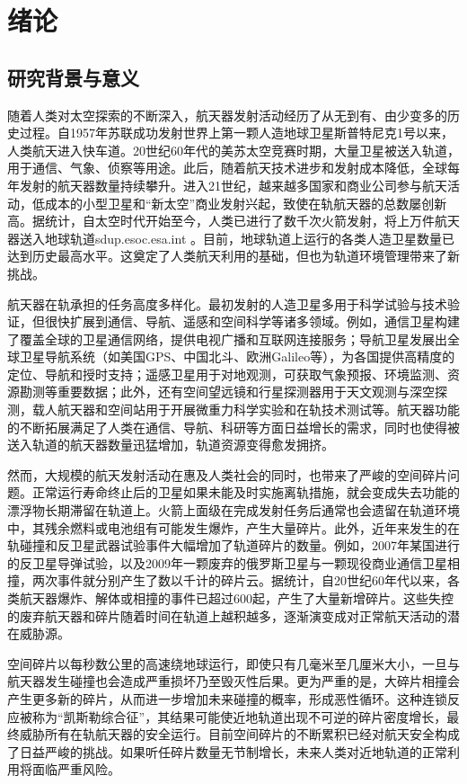 
\chapter{绪论}
\label{chap:intro}

\section{研究背景与意义}
随着人类对太空探索的不断深入，航天器发射活动经历了从无到有、由少变多的历史过程。自1957年苏联成功发射世界上第一颗人造地球卫星斯普特尼克1号以来，人类航天进入快车道。20世纪60年代的美苏太空竞赛时期，大量卫星被送入轨道，用于通信、气象、侦察等用途。此后，随着航天技术进步和发射成本降低，全球每年发射的航天器数量持续攀升。进入21世纪，越来越多国家和商业公司参与航天活动，低成本的小型卫星和“新太空”商业发射兴起，致使在轨航天器的总数屡创新高。据统计，自太空时代开始至今，人类已进行了数千次火箭发射，将上万件航天器送入地球轨道​
sdup.esoc.esa.int
。目前，地球轨道上运行的各类人造卫星数量已达到历史最高水平\cite{prol2022position,zhao2022overview}。这奠定了人类航天利用的基础，但也为轨道环境管理带来了新挑战。

航天器在轨承担的任务高度多样化。最初发射的人造卫星多用于科学试验与技术验证，但很快扩展到通信、导航、遥感和空间科学等诸多领域。例如，通信卫星构建了覆盖全球的卫星通信网络，提供电视广播和互联网连接服务；导航卫星发展出全球卫星导航系统（如美国GPS、中国北斗、欧洲Galileo等），为各国提供高精度的定位、导航和授时支持；遥感卫星用于对地观测，可获取气象预报、环境监测、资源勘测等重要数据；此外，还有空间望远镜和行星探测器用于天文观测与深空探测，载人航天器和空间站用于开展微重力科学实验和在轨技术测试等\cite{zhao2022overview,nozawa2023extent}。航天器功能的不断拓展满足了人类在通信、导航、科研等方面日益增长的需求，同时也使得被送入轨道的航天器数量迅猛增加，轨道资源变得愈发拥挤。

然而，大规模的航天发射活动在惠及人类社会的同时，也带来了严峻的空间碎片问题。正常运行寿命终止后的卫星如果未能及时实施离轨措施，就会变成失去功能的漂浮物长期滞留在轨道上。火箭上面级在完成发射任务后通常也会遗留在轨道环境中，其残余燃料或电池组有可能发生爆炸，产生大量碎片。此外，近年来发生的在轨碰撞和反卫星武器试验事件大幅增加了轨道碎片的数量。例如，2007年某国进行的反卫星导弹试验，以及2009年一颗废弃的俄罗斯卫星与一颗现役商业通信卫星相撞，两次事件就分别产生了数以千计的碎片云。据统计，自20世纪60年代以来，各类航天器爆炸、解体或相撞的事件已超过600起，产生了大量新增碎片\cite{debris1}。这些失控的废弃航天器和碎片随着时间在轨道上越积越多，逐渐演变成对正常航天活动的潜在威胁源。

空间碎片以每秒数公里的高速绕地球运行，即使只有几毫米至几厘米大小，一旦与航天器发生碰撞也会造成严重损坏乃至毁灭性后果。更为严重的是，大碎片相撞会产生更多新的碎片，从而进一步增加未来碰撞的概率，形成恶性循环。这种连锁反应被称为“凯斯勒综合征”，其结果可能使近地轨道出现不可逆的碎片密度增长，最终威胁所有在轨航天器的安全运行\cite{debris2}。目前空间碎片的不断累积已经对航天安全构成了日益严峻的挑战\cite{debris1,debris2}。如果听任碎片数量无节制增长，未来人类对近地轨道的正常利用将面临严重风险。

